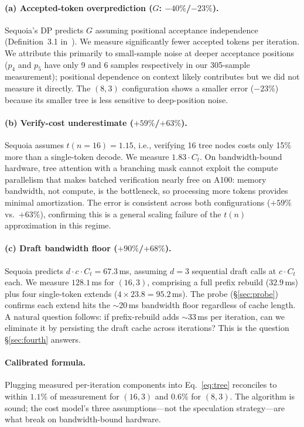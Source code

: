 \documentclass[letterpaper,twocolumn,10pt]{article}
\begin{document}
\paragraph{(a) Accepted-token overprediction ($G$: $-40\%$/$-23\%$).}
Sequoia's DP predicts $G$ assuming positional acceptance independence (Definition~3.1 in~\cite{chen2024sequoia}).
We measure significantly fewer accepted tokens per iteration.
We attribute this primarily to small-sample noise at deeper acceptance positions ($p_4$ and $p_5$ have only 9 and 6 samples respectively in our 305-sample measurement); positional dependence on context likely contributes but we did not measure it directly.
The $(8,3)$ configuration shows a smaller error ($-23\%$) because its smaller tree is less sensitive to deep-position noise.

\paragraph{(b) Verify-cost underestimate ($+59\%$/$+63\%$).}
Sequoia assumes $t(n{=}16) = 1.15$, i.e., verifying 16 tree nodes costs only 15\% more than a single-token decode.
We measure $1.83 \cdot C_t$.
On bandwidth-bound hardware, tree attention with a branching mask cannot exploit the compute parallelism that makes batched verification nearly free on A100: memory bandwidth, not compute, is the bottleneck, so processing more tokens provides minimal amortization.
The error is consistent across both configurations ($+59\%$ vs.\ $+63\%$), confirming this is a general scaling failure of the $t(n)$ approximation in this regime.

\paragraph{(c) Draft bandwidth floor ($+90\%$/$+68\%$).}
Sequoia predicts $d \cdot c \cdot C_t = 67.3$\,ms, assuming $d{=}3$ sequential draft calls at $c \cdot C_t$ each.
We measure $128.1$\,ms for $(16,3)$, comprising a full prefix rebuild ($32.9$\,ms) plus four single-token extends ($4 \times 23.8 = 95.2$\,ms).
The probe (\S\ref{sec:probe}) confirms each extend hits the $\sim$20\,ms bandwidth floor regardless of cache length.
A natural question follows: if prefix-rebuild adds $\sim$33\,ms per iteration, can we eliminate it by persisting the draft cache across iterations? This is the question \S\ref{sec:fourth} answers.

\paragraph{Calibrated formula.}
Plugging measured per-iteration components into Eq.~\ref{eq:tree} reconciles to within $1.1\%$ of measurement for $(16,3)$ and $0.6\%$ for $(8,3)$.
The algorithm is sound; the cost model's three assumptions---not the speculation strategy---are what break on bandwidth-bound hardware.
\end{document}
